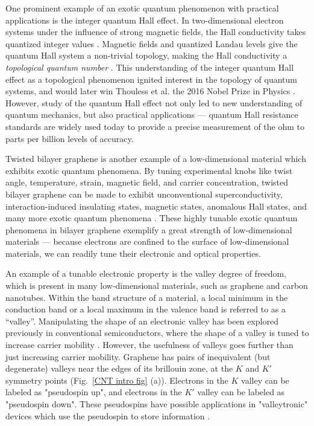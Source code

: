 \documentclass[double,12pt,1in,seploa]{beavtex}
\begin{document}
One prominent example of an exotic quantum phenomenon with practical applications is the integer quantum Hall effect. In two-dimensional electron systems under the influence of strong magnetic fields, the Hall conductivity takes quantized integer values \cite{wakabayashi_hall_1978}. Magnetic fields and quantized Landau levels give the quantum Hall system a non-trivial topology, making the Hall conductivity a \textit{topological quantum number} \cite{thouless_quantized_1982}. This understanding of the integer quantum Hall effect as a topological phenomenon ignited interest in the topology of quantum systems, and would later win Thouless et al. the 2016 Nobel Prize in Physics \cite{noauthor_nobel_nodate}. However, study of the quantum Hall effect not only led to new understanding of quantum mechanics, but also practical applications — quantum Hall resistance standards are widely used today to provide a precise measurement of the ohm to parts per billion levels of accuracy. 

Twisted bilayer graphene is another example of a low-dimensional material which exhibits exotic quantum phenomena. By tuning experimental knobs like twist angle, temperature, strain, magnetic field, and carrier concentration, twisted bilayer graphene can be made to exhibit unconventional superconductivity, interaction-induced insulating states, magnetic states, anomalous Hall states, and many more exotic quantum phenomena \cite{andrei_graphene_2020}. These highly tunable exotic quantum phenomena in bilayer graphene exemplify a great strength of low-dimensional materials — because electrons are confined to the surface of low-dimensional materials, we can readily tune their electronic and optical properties.

An example of a tunable electronic property is the valley degree of freedom, which is present in many low-dimensional materials, such as graphene and carbon nanotubes. Within the band structure of a material, a local minimum in the conduction band or a local maximum in the valence band is referred to as a “valley”. Manipulating the shape of an electronic valley has been explored previously in conventional semiconductors, where the shape of a valley is tuned to increase carrier mobility \cite{thompson_90-nm_2004}. However, the usefulness of valleys goes further than just increasing carrier mobility. Graphene has pairs of inequivalent (but degenerate) valleys near the edges of its brillouin zone, at the $K$ and $K'$ symmetry points (Fig.\ \ref{CNT intro fig} (a)). Electrons in the $K$ valley can be labeled as "pseudospin up", and electrons in the $K'$ valley can be labeled as "pseudospin down". These pseudospins have possible applications in "valleytronic" devices which use the pseudospin to store information \cite{schaibley_valleytronics_2016}. 
\end{document}
